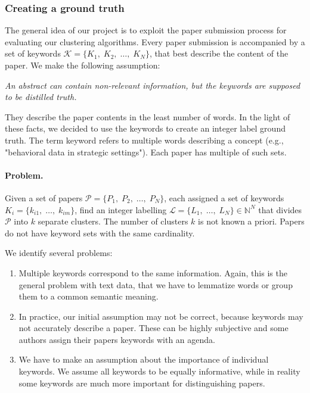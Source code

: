 \subsubsection{Creating a ground truth}
\label{sec:create_gt}
The general idea of our project is to exploit the paper submission process for evaluating our clustering algorithms. Every paper submission is accompanied by a set of keywords $ \mathcal{K} = \{ K_{1},\; K_{2},\; \dots ,\; K_{N} \} $, that best describe the content of the paper. We make the following assumption: 
\begin{center}
	\textit{An abstract can contain non-relevant information, but the keywords are supposed to be distilled truth.}
\end{center}
They describe the paper contents in the least number of words. In the light of these facts, we decided to use the keywords to create an integer label ground truth. 
The term keyword refers to multiple words describing a concept (e.g., "behavioral data in strategic settings"). Each paper has multiple of such sets.

\paragraph{Problem.} Given a set of papers $ \mathcal{P} = \{ P_{1},\; P_{2},\; \dots,\; P_{N} \} $, each assigned a set of keywords $ K_{i} = \{ k_{i1},\; \dots ,\; k_{im} \} $, find an integer labelling $ \mathcal{L} = \{ L_{1},\; \dots,\; L_{N} \} \in \mathbb{N}^{N} $ that divides $ \mathcal{P} $ into $ k $ separate clusters. The number of clusters $ k $ is not known a priori. Papers do not have keyword sets with the same cardinality.

We identify several problems: 
\begin{enumerate}
	\item Multiple keywords correspond to the same information. Again, this is the general problem with text data, that we have to lemmatize words or group them to a common semantic meaning.
	\item In practice, our initial assumption may not be correct, because keywords may not accurately describe a paper. These can be highly subjective and some authors assign their papers keywords with an agenda.
	\item We have to make an assumption about the importance of individual keywords. We assume all keywords to be equally informative, while in reality some keywords are much more important for distinguishing papers.
\end{enumerate}

